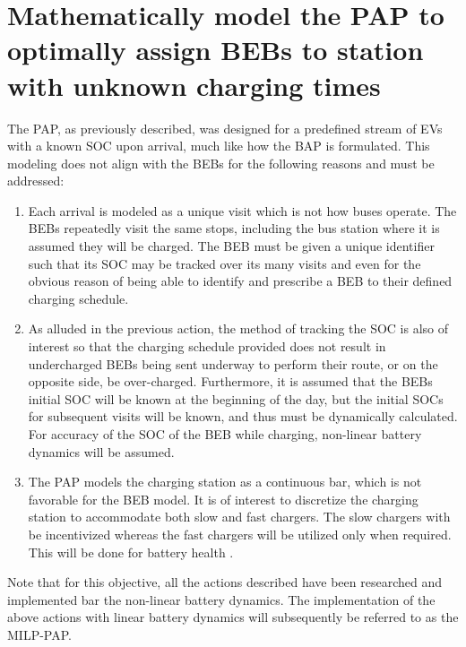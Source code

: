 \documentclass[ee,msthesis]{usuthesis}
\begin{document}
\section{Mathematically model the PAP to optimally assign BEBs to station with unknown charging times}
\label{sec:org072b7e5}
The PAP, as previously described, was designed for a predefined stream of EVs with a known SOC upon arrival, much like
how the BAP is formulated. This modeling does not align with the BEBs for the following reasons and must be addressed:

\begin{enumerate}
\item Each arrival is modeled as a unique visit which is not how buses operate. The BEBs repeatedly visit the same stops,
including the bus station where it is assumed they will be charged. The BEB must be given a unique identifier such
that its SOC may be tracked over its many visits and even for the obvious reason of being able to identify and
prescribe a BEB to their defined charging schedule.

\item As alluded in the previous action, the method of tracking the SOC is also of interest so that the charging schedule
provided does not result in undercharged BEBs being sent underway to perform their route, or on the opposite side, be
over-charged. Furthermore, it is assumed that the BEBs initial SOC will be known at the beginning of the day, but the
initial SOCs for subsequent visits will be known, and thus must be dynamically calculated. For accuracy of the SOC of
the BEB while charging, non-linear battery dynamics will be assumed.

\item The PAP models the charging station as a continuous bar, which is not favorable for the BEB model. It is of interest
to discretize the charging station to accommodate both slow and fast chargers. The slow chargers with be incentivized
whereas the fast chargers will be utilized only when required. This will be done for battery health
\cite{motapon-2020-gener-cycle}.
\end{enumerate}

Note that for this objective, all the actions described have been researched and implemented bar the non-linear
battery dynamics. The implementation of the above actions with linear battery dynamics will subsequently be referred to
as the MILP-PAP.
\end{document}
